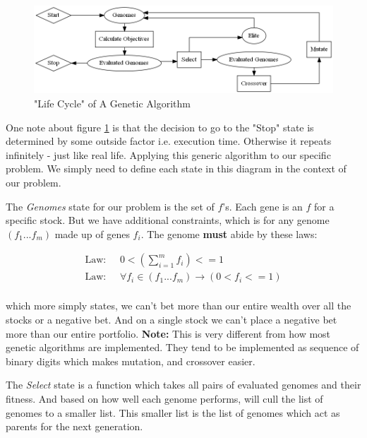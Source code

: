 \documentclass[11pt]{article}
\begin{document}
    \begin{figure}[H] %
        \centering
        \includegraphics[width=\textwidth]{GA}
        \caption{"Life Cycle" of A Genetic Algorithm}\label{fig:GA}
    \end{figure}

    One note about figure \ref{fig:GA} is that the decision to go to the "Stop"
    state is determined by some outside factor i.e. execution time. Otherwise
    it repeats infinitely - just like real life. Applying this generic algorithm to 
    our specific problem. We simply need to
    define each state in this diagram in the context of our problem.

    The \textit{Genomes} state for our problem is the set of \(f\)'s. Each gene is an
    \(f\) for a specific stock. But we have additional constraints, which is for 
    any genome \((f_1...f_m)\) made up of genes \(f_i\). The genome \textbf{must}
    abide by these laws:

    \begin{align*}
        \text{Law: } & \;
        0 < \left(
            \displaystyle\sum^{m}_{i=1} f_i
        \right) <= 1 \\
        \text{Law: } & \;
        \forall f_i \in (f_1...f_m) \to \left(
            0 < f_i <= 1
        \right) \\
    \end{align*}

    which more simply states, we can't bet more than our entire wealth over all the stocks or
    a negative bet. And on a single stock we can't place a negative bet more than our
    entire portfolio. \textbf{Note:} This is very different from how most genetic algorithms
    are implemented. They tend to be implemented as sequence of binary digits which makes
    mutation, and crossover easier. 

    The \textit{Select} state is a function which takes all pairs of evaluated genomes
    and their fitness. And based on how well each genome performs, will cull the
    list of genomes to a smaller list. This smaller list is the list of genomes
    which act as parents for the next generation.
\end{document}
